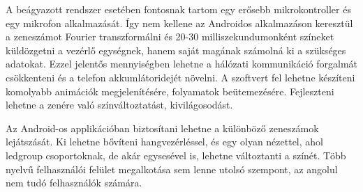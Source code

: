 \documentclass[../main.tex]{subfiles}
\begin{document}
        A beágyazott rendszer esetében fontosnak tartom egy erősebb mikrokontroller és egy mikrofon alkalmazását. Így nem kellene az Androidos alkalmazáson keresztül a zeneszámot Fourier transzformálni és 20-30 milliszekundumonként színeket küldözgetni a vezérlő egységnek, hanem saját magának számolná ki a szükséges adatokat. Ezzel jelentős mennyiségben lehetne a hálózati kommunikáció forgalmát csökkenteni és a telefon akkumlátoridejét növelni. A szoftvert fel lehetne készíteni komolyabb animációk megjelenítésére, folyamatok beütemezésére. Fejleszteni lehetne a zenére való színváltoztatást, kivilágosodást.
        
        Az Android-os applikációban biztosítani lehetne a különböző zeneszámok lejátszását. Ki lehetne bővíteni hangvezérléssel, és egy olyan nézettel, ahol ledgroup csoportoknak, de akár egysesével is, lehetne változtanti a színét. Több nyelvű felhasználói felület megalkotása sem lenne utolsó szempont, az angolul nem tudó felhasználók számára. 
        
        
\end{document}
